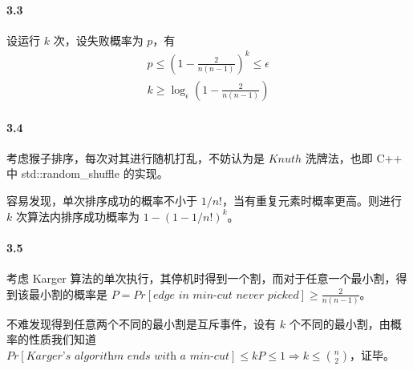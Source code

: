 \documentclass[12pt, a4paper, oneside]{ctexart}
\begin{document}
	\paragraph{3.3}
	设运行 $k$ 次，设失败概率为 $p$，有 $$\begin{aligned}
		p\leq(1-\frac{2}{n(n-1)})^k\leq \epsilon\\
		k\geq \log_\epsilon (1-\frac{2}{n(n-1)})
	\end{aligned}$$
	
	\paragraph{3.4}
	
	考虑猴子排序，每次对其进行随机打乱，不妨认为是 $Knuth$ 洗牌法，也即 C++ 中 std::random\_shuffle 的实现。
	
	容易发现，单次排序成功的概率不小于 $1/n!$，当有重复元素时概率更高。则进行 $k$ 次算法内排序成功概率为 $1-(1-1/n!)^k$。
	
	\paragraph{3.5}
	考虑 Karger 算法的单次执行，其停机时得到一个割，而对于任意一个最小割，得到该最小割的概率是 $P=Pr[\textit{edge in  min-cut never picked}]\geq \frac{2}{n(n-1)}$。
	
	不难发现得到任意两个不同的最小割是互斥事件，设有 $k$ 个不同的最小割，由概率的性质我们知道 $Pr[\textit{Karger's algorithm ends with a min-cut}]\leq kP\leq 1 \Rightarrow k \leq {n\choose 2}$，证毕。
	
\end{document}
